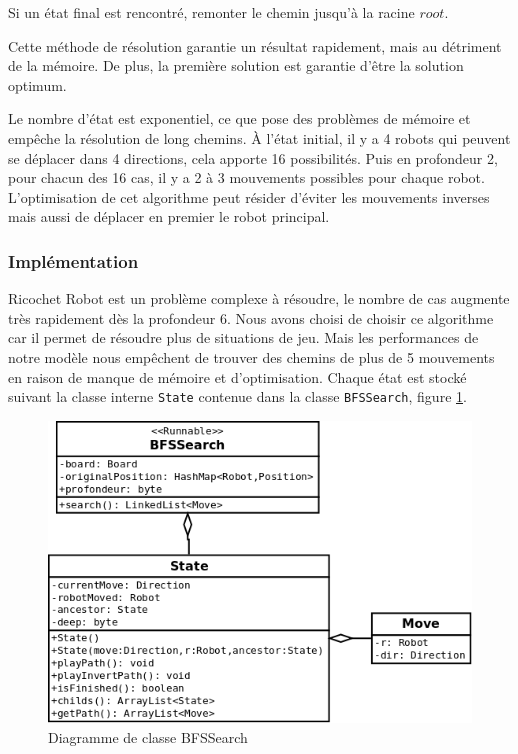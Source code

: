 \documentclass[a4paper]{article} %
\begin{document}
Si un état final est rencontré, remonter le chemin jusqu'à la racine $root$.

Cette méthode de résolution garantie un résultat rapidement, mais au détriment de la mémoire. De plus, la première solution est garantie d'être la solution optimum.

Le nombre d'état est exponentiel, ce que pose des problèmes de mémoire et empêche la résolution de long chemins. À l'état initial, il y a 4 robots qui peuvent se déplacer dans 4 directions, cela apporte 16 possibilités. Puis en profondeur 2, pour chacun des 16 cas, il y a 2 à 3 mouvements possibles pour chaque robot. L'optimisation de cet algorithme peut résider d'éviter les mouvements inverses mais aussi de déplacer en premier le robot principal.

		\subsubsection{Implémentation}
Ricochet Robot est un problème complexe à résoudre, le nombre de cas augmente très rapidement dès la profondeur 6. Nous avons choisi de choisir ce algorithme car il permet de résoudre plus de situations de jeu. Mais les performances de notre modèle nous empêchent de trouver des chemins de plus de 5 mouvements en raison de manque de mémoire et d'optimisation. Chaque état est stocké suivant la classe interne \texttt{State} contenue dans la classe \texttt{BFSSearch}, figure \ref{bfs}.

\begin{figure}[htpb]
	\begin{center}
	\includegraphics[scale=0.3]{./images/bfssearch.png}
	\caption{Diagramme de classe BFSSearch}\label{bfs}
	\end{center}
\end{figure}
\end{document}
